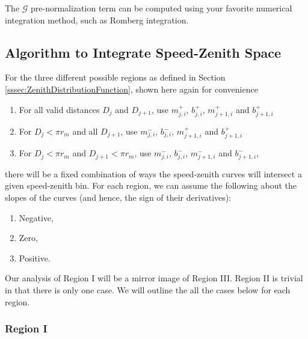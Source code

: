 \documentclass{hitec}
\numberwithin{equation}{section}
\begin{document}
The $\mathcal{G}$ pre-normalization term can be computed using your favorite numerical integration method, such as Romberg integration.
 
\subsection{Algorithm to Integrate Speed-Zenith Space}
For the three different possible regions as defined in Section \ref{sssec:ZenithDistributionFunction}, shown here again for convenience

\begin{enumerate}[label=Region \Roman*:]
	\item For all valid distances $D_j$ and $D_{j+1}$, use $m_{j,i}^{+}$, $b_{j,i}^{+}$, $m_{j+1,i}^{+}$ and $b_{j+1,i}^{+}$
	\item For $D_j < \pi r_m$ and all $D_{j+1}$, use $m_{j,i}^{-}$, $b_{j,i}^{-}$, $m_{j+1,i}^{+}$ and $b_{j+1,i}^{+}$
	\item For $D_j < \pi r_m$ and $D_{j+1} < \pi r_m$, use $m_{j,i}^{-}$, $b_{j,i}^{-}$, $m_{j+1,i}^{-}$ and $b_{j+1,i}^{-}$,
\end{enumerate}

there will be a fixed combination of ways the speed-zenith curves will intersect a given speed-zenith bin. For each region, we can assume the following about the slopes of the curves (and hence, the sign of their derivatives):
\begin{enumerate}[label=Region \Roman*:]
	\item Negative,
	\item Zero,
	\item Positive.
\end{enumerate}
Our analysis of Region I will be a mirror image of Region III. Region II is trivial in that there is only one case. We will outline the all the cases below for each region.

\subsubsection{Region I}
\end{document}
